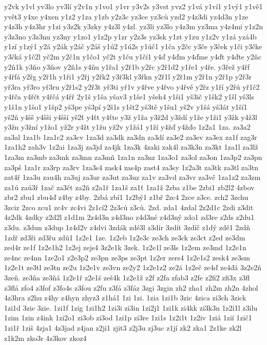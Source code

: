 {y2vk
y1vl
yv3lo
yv3lí
y2v1n
y1vo1
y1vr
y3v2s
y3vst
yvz2
y1vá
y1ví1
y1vý1
y1vě1
yvět3
y4xe
y4xen
y1z2
y1za
y1zb
y2z3c
yz3ce
yz3ců
yzd2
y4z3di
yz4d3n
y1ze
y4z3h
y4z3hr
y1zi
y3z2k
y3zky
y4z3l
y4zl.
yz3li
yz3lo
y4z3m
yz3ma
y4z4mi
y1z2n
y3z3no
y3z3nu
yz3ny
y1zo1
y1z2p
y1zr
y2z3s
yz3sk
y1zt
y1zu
y1z2v
y1zá
yzá4b
y1zí
y1zý1
y2á
y2ák
y2áč
y2áš
y1ú2
y1ú2s
y1úč1
y1ča
y2čc
y3če
y3ček
y1či
y3čke
y3čká
y1č2l
yč2m
y2č1n
y1čo1
yč2t
y1ču
y1čí1
y4ď
y4ďm
y4ďme
y4ďt
y4ďte
y2ňc
y2ň1k
y3ňo
y3ňov
y2ň1s
y4ňu
y1řa1
y2ř1b
y2řc
y2ř1d2
y1ře1
y4ře.
y3řež
y4řf
y4řfá
y2řg
y2ř1h
y1ři1
y2řj
y2řk2
y3ř3kl
y3řkn
y2ř1l
y2ř1m
y2ř1n
y2ř1p
y2ř3r
yř3ra
yř3ro
yř3ru
y2ř1s2
y2ř3t
yř3ti
yř1v
y4řve
y4řvo
y4řvě
y2řz
y1ří
y2řú
yř1č2
y4řča
y4řčt
y4řčá
y4řř
2y1š
y1ša
yšav3
y1še1
yšeh4
y1ši1
yš3ič
y1šk2
y1šl
yš3ls
y1š1n
y1šo1
y1šp2
yš3pe
yš3pí
y2š1s
y1št2
yš3tě
y1šu1
yš2v
y1šá
yš3át
y1ší1
yš2ň
y4šš
y4šši
y4šší
yš2ť
y4ťt
y4ťte
y3ž
y1ža
y3ž2d
y3ždí
y1že
y1ži1
y3žk
y4ž3l
y3žn
y3žní
y1žo1
yž2r
y4žt
y1žu
yž2v
y1žá1
y1ží
y4žď
y4žďo
1z2a1
1za.
za3a2
za3al
1za1b
1za1c2
za3cv
1za3d
za3dk
za3dn
za3dí
za3e2
za3ev
za3ex
za1f
zag3r
1za1h2
zah3v
1z2ai
1za3j
za3jd
za4jk
1za3k
4zaki
zak4l
za3k3n
za3kt
1za1l
za3lž
1za3m
za3mb
za3mk
za3mn
za3mň
1za1n
za3nz
1za3o1
za3ol
za3on
1za3p2
za3pn
za3pš
1za1r
za3rp
za3rv
1za3s4
zask4
zas4p
zast4
za3sy
1z2a3t
za3tk
za3tl
za3tn
zat4ř
1za3u
zau4h
za3uj
za3ur
za3ut
za3uz
za1v
za3vd
za3vr
za3vč
1za1z2
za3zm
za1ú
zaú3ř
1zač
za3čt
za2ň
z2a1ř
1za1š
za1ť
1za1ž
2zba
z1be
2zbi1
zb2l2
4zbov
zbr2
zbu1
zbu4ď
z4by
z4by.
2zbá
zbí1
1z2bý1
z1bř
2zc4
2zce
z3ce.
zch2
3zchu
3zciz
2zco
zcu1
zc4v
zc4vi
2z1cí2
2z3ců
z3ců.
2zd.
zda1
4zdal
2z2d1c
2zdi
z3dit
4z2dk
4zdky
z2d2l
z1d1m
2z4d3n
z4d3no
z4d3né
z4d3ný
zdo1
zd3re
z2ds
z2du1
z3du.
z3dun
z3dup
1z4d2v
z4dvi
3zdák
zdé3l
z3dír
3zdít
3zdíč
z1dý
zdě1
2zdň
1zdř
zd3ři
zd3řu
zdů1
1z2e1
1ze.
1z2eb
1z2e3c
ze3ch
ze3ck
ze3ct
z2ed
ze3dm
zed4r
ze1f
1z2e1h2
1z2ej
zejs4
3z2e1k
3zek.
1z2e1l
ze3ls
1z2em
ze3md
1z2e1n
ze4nc
ze4nn
1ze2o1
z2e3p2
ze3pn
ze3ps
ze3pt
1z2er
zers4
1z2e1s2
zesk4
ze3sm
1z2e1t
ze3tl
ze3tn
ze2u
1z2e1v
ze3vn
ze2y2
1z2e1z2
ze2á
1z2eč
ze4ď
ze4ďá
3z2e2ň
3zeň.
ze3ňa
ze3ňá
1z2e1ř
z2e1š
zeš4k
1z2e1ž
z2f
z2fa
zfab3
z2fe
z2fi2
zfi3x
z3fl
z3flá
zfo4
z3fof
z3fo4s
z3fou
z2fu
z3fá
z3fáz
3zgi
3zgin
zh2
zha1
zh2m
zh2n
4zhol
4z3hra
z2hu
z4hy
z4hyn
zhyz3
z1há1
1zi
1zi.
1zia
1zi1b
3zic
4zica
zi3ch
3zick
1zi1d
3zie
3zie.
1zi1f
1zig
1zi1h2
1zi3i
zi3in
1zi2j1
1zi1k
zi4kk
zi3k3n
1z2i1l
z3ilu
1zim
1zin
z4ink
1zi2o1
zi3ob
zi3od
1zi1p
zi3re
1zi1s
1z2i1t
1z2iv
1ziá
1zií
1zič1
1zi1ř
1ziš
4zja1
4z3jad
z4jan
z2ji1
zjit3
z2j3u
zj3uc
z1jí
zk2
zka1
2z1ke
zk2l
z1k2m
zko3r
4z3kov
zkoz4
}
